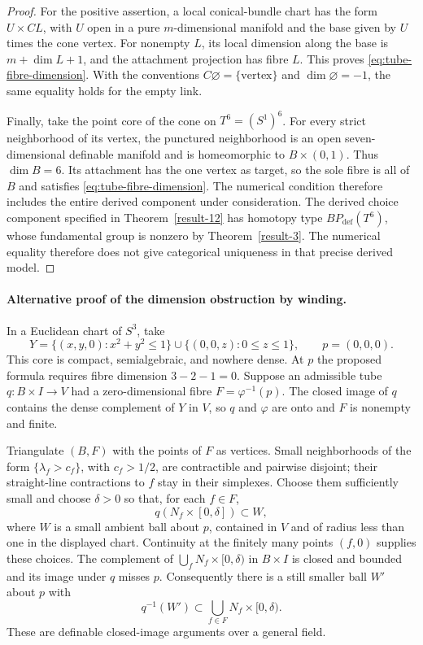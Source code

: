 \begin{proof}
For the positive assertion, a local conical-bundle chart has the
form $U\times CL$, with $U$ open in a pure $m$-dimensional manifold
and the base given by $U$ times the cone vertex.  For nonempty $L$,
its local dimension along the base is $m+\dim L+1$, and the
attachment projection has fibre $L$.  This proves
\eqref{eq:tube-fibre-dimension}.  With the conventions
$C\varnothing=\{\mathrm{vertex}\}$ and
$\dim\varnothing=-1$, the same equality holds for the empty link.

Finally, take the point core of the cone on $T^6=(S^1)^6$.
For every strict neighborhood of its vertex, the punctured
neighborhood is an open seven-dimensional definable manifold and
is homeomorphic to $B\times(0,1)$. Thus $\dim B=6$.
Its attachment has the one vertex as target, so the sole fibre
is all of $B$ and satisfies \eqref{eq:tube-fibre-dimension}.
The numerical condition therefore includes the entire derived
component under consideration.  The derived choice component
specified in Theorem~\ref{result-12} has homotopy type
$BP_{\mathrm{def}}(T^6)$, whose fundamental group is nonzero by
Theorem~\ref{result-3}.  The numerical equality therefore does not
give categorical uniqueness in that precise derived model.
\end{proof}

\paragraph{Alternative proof of the dimension obstruction by winding.}
In a Euclidean chart of $S^3$, take
\[
 Y=\{(x,y,0):x^2+y^2\leq1\}
   \cup\{(0,0,z):0\leq z\leq1\},
 \qquad p=(0,0,0).
\]
This core is compact, semialgebraic, and nowhere dense.
At $p$ the proposed formula requires fibre dimension $3-2-1=0$.
Suppose an admissible tube
$q:B\times I\to V$ had a zero-dimensional fibre
$F=\varphi^{-1}(p)$.  The closed image of $q$ contains the dense
complement of $Y$ in $V$, so $q$ and $\varphi$ are onto and $F$ is
nonempty and finite.

Triangulate $(B,F)$ with the points of $F$ as vertices.
Small neighborhoods of the form $\{\lambda_f>c_f\}$, with
$c_f>1/2$, are contractible and pairwise disjoint; their straight-line
contractions to $f$ stay in their simplexes.
Choose them sufficiently small and choose $\delta>0$ so that, for
each $f\in F$,
\[
 q(N_f\times[0,\delta])\subset W,
\]
where $W$ is a small ambient ball about $p$, contained in $V$ and
of radius less than one in the displayed chart.
Continuity at the finitely many points $(f,0)$ supplies these choices.
The complement of
$\bigcup_f N_f\times[0,\delta)$ in $B\times I$ is closed and
bounded and its image under $q$ misses $p$.
Consequently there is a still smaller ball $W'$ about $p$ with
\[
 q^{-1}(W')\subset\bigcup_{f\in F}N_f\times[0,\delta).
\]
These are definable closed-image arguments over a general field.

